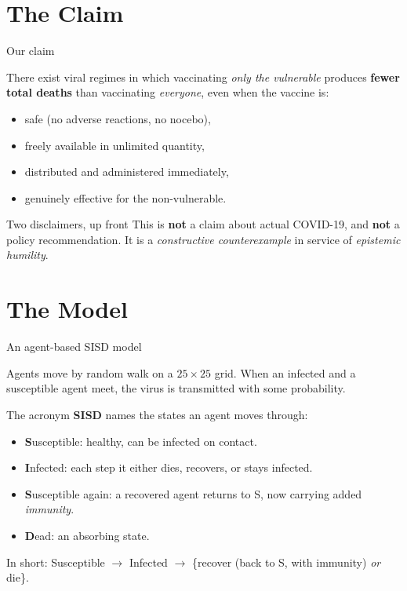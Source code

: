 \documentclass{if-beamer}
\begin{document}
\section{The Claim}
\begin{frame}{Our claim}
\justifying

There exist viral regimes in which vaccinating \emph{only the vulnerable} produces \textbf{fewer total deaths} than vaccinating \emph{everyone},
even when the vaccine is:

\strut

\begin{itemize}
  \item safe (no adverse reactions, no nocebo),
  \item freely available in unlimited quantity,
  \item distributed and administered immediately,
  \item genuinely effective for the non-vulnerable.
\end{itemize}

\strut

\pause
\begin{alertblock}{Two disclaimers, up front}
This is \textbf{not} a claim about actual COVID-19, and \textbf{not} a policy recommendation. It is a \emph{constructive counterexample} in service of \emph{epistemic humility}.
\end{alertblock}
\end{frame}

\section{The Model}
\begin{frame}{An agent-based SISD model}
\justifying

Agents move by random walk on a $25\times25$ grid. When an infected and a susceptible agent meet, the virus is transmitted with some probability.

\strut
\pause

The acronym \textbf{SISD} names the states an agent moves through:
\begin{itemize}
  \item \textbf{S}usceptible: healthy, can be infected on contact.
  \item \textbf{I}nfected: each step it either dies, recovers, or stays infected.
  \item \textbf{S}usceptible again: a recovered agent returns to S, now carrying added \emph{immunity}.
  \item \textbf{D}ead: an absorbing state.
\end{itemize}

\strut

\pause
In short: Susceptible $\to$ Infected $\to$ \{recover (back to S, with immunity) \emph{or} die\}.
\end{frame}
\end{document}
